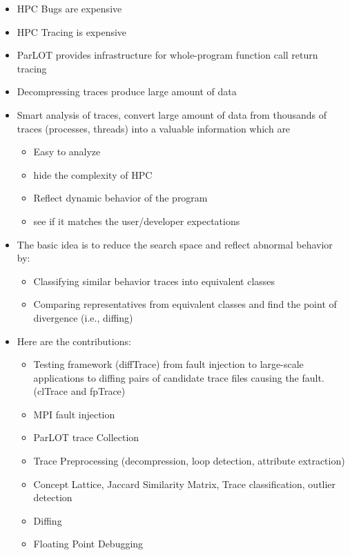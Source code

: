 \begin{itemize}
\item HPC Bugs are expensive
\item HPC Tracing is expensive
\item ParLOT provides infrastructure for whole-program function call return tracing
\item Decompressing traces produce large amount of data
\item Smart analysis of traces, convert large amount of data from thousands of traces (processes, threads) into a valuable information which are
	\begin{itemize}
	\item Easy to analyze
	\item hide the complexity of HPC
	\item Reflect dynamic behavior of the program
	\item see if it matches the user/developer expectations
	\end{itemize}
\item The basic idea is to reduce the search space and reflect abnormal behavior by:
	\begin{itemize}
	\item Classifying similar behavior traces into equivalent classes
	\item Comparing representatives from equivalent classes and find the point of divergence (i.e., diffing)
	\end{itemize}
\item Here are the contributions:
	\begin{itemize}
	\item Testing framework (diffTrace) from fault injection to large-scale applications to diffing pairs of candidate trace files causing the fault. (clTrace and fpTrace)
	\item MPI fault injection
	\item ParLOT trace Collection
	\item Trace Preprocessing (decompression, loop detection, attribute extraction)
	\item Concept Lattice, Jaccard Similarity Matrix, Trace classification, outlier detection
	\item Diffing
	\item Floating Point Debugging
	\end{itemize}
\end{itemize}
